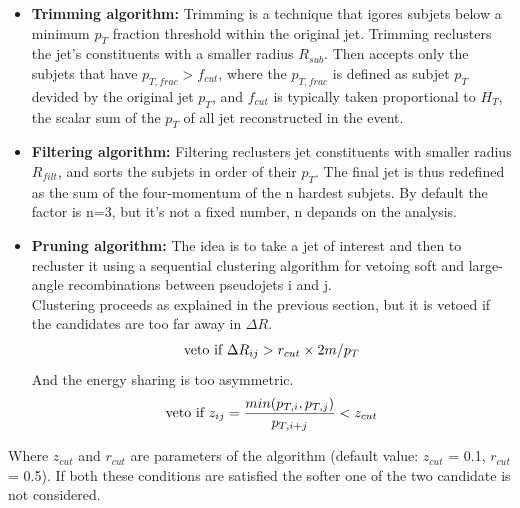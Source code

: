 \begin{itemize}
  \item \textbf{Trimming algorithm:} Trimming is a technique that igores subjets below a minimum $p_{T}$ fraction threshold within the original jet. Trimming reclusters the jet's constituents with a smaller radius $R_{sub}$. Then accepts only the subjets that have $p_{T,frac} > f_{cut}$, where the $p_{T,frac}$ is defined as subjet $p_{T}$ devided by the original jet $p_{T}$, and $f_{cut}$ is typically taken proportional to $H_{T}$, the scalar sum of the $p_{T}$ of all jet reconstructed in the event.
  \item \textbf{Filtering algorithm:} Filtering reclusters jet constituents with smaller radius $R_{filt}$, and sorts the subjets in order of their $p_{T}$. The final jet is thus redefined as the sum of the four-momentum of the n hardest subjets. By default the factor is n=3, but it's not a fixed number, n depands on the analysis.
  \item \textbf{Pruning algorithm:} The idea is to take a jet of interest and then to recluster it using a sequential clustering algorithm for vetoing soft and large-angle recombinations between pseudojets i and j.\\ Clustering proceeds as explained in the previous section, but it is vetoed if the candidates are too far away in $\Delta R$.\\
    \begin{align}
      \textup{veto if }\Delta R_{ij} > r_{cut}\times 2m/p_{T}
    \end{align}
    And the energy sharing is too asymmetric.
    \begin{align}
      \textup{veto if } z_{ij} = \frac{min({p_{T,i},p_{T,j})}}{p_{T,i+j}} < z_{cut}
    \end{align}
\end{itemize}

Where $z_{cut}$ and $r_{cut}$ are parameters of the algorithm (default value: $z_{cut}$ = 0.1, $r_{cut}$ = 0.5). If both these conditions are satisfied the softer one of the two candidate is not considered.

